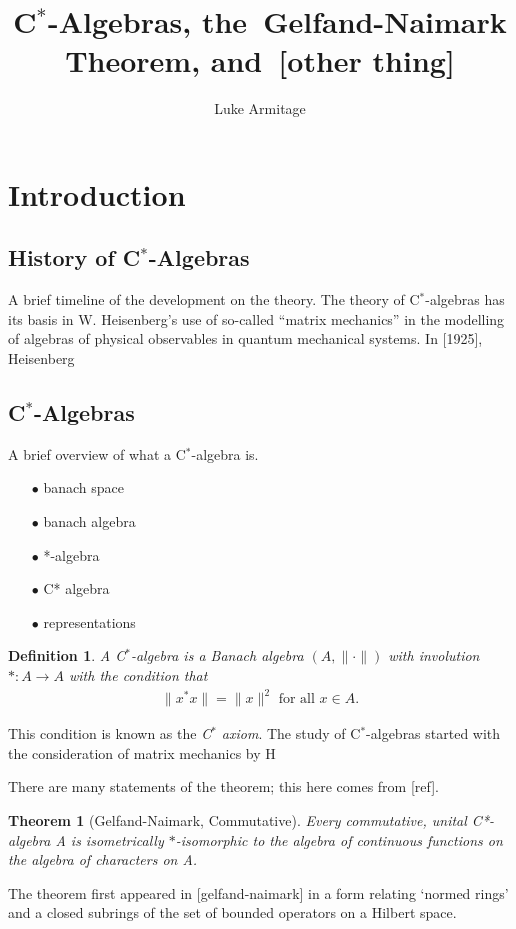 \documentclass[12pt,a4paper]{amsart}
\author{Luke Armitage}
\title{C$^\ast$-Algebras, the~Gelfand-Naimark Theorem, and~[other thing]}
\theoremstyle{plain}
\newtheorem*{thm*}{Theorem}
\theoremstyle{defn}
\newtheorem{defn}{Definition}
\begin{document}
\maketitle
\section{Introduction}
\subsection{History of C$^\ast$-Algebras}
	A brief timeline of the development on the theory.
The theory of C$^\ast$-algebras has its basis in W. Heisenberg's use of so-called ``matrix mechanics'' in the modelling of algebras of physical observables in quantum mechanical systems. In [1925], Heisenberg 
	
\subsection{C$^\ast$-Algebras}
	A brief overview of what a C$^\ast$-algebra is.
\begin{enumerate}
	\item[$\bullet$] banach space
	\item[$\bullet$] banach algebra
	\item[$\bullet$] *-algebra
	\item[$\bullet$] C* algebra
	\item[$\bullet$] representations
\end{enumerate}
\begin{defn}
A \emph{C$^\ast$-algebra} is a Banach algebra $(A, \| \cdot \|)$ with involution $\ast : A \to A$ with the condition that
\begin{align*}
	\|x ^\ast x\| = \|x\|^2 \mbox{ for all } x \in A.
\end{align*}
\end{defn}

This condition is known as the \emph{C$^\ast$ axiom}. The study of C$^\ast$-algebras started with the consideration of matrix mechanics by H

There are many statements of the theorem; this here comes from [ref].
\begin{thm*}[Gelfand-Naimark, Commutative]
	Every commutative, unital C*-algebra A is isometrically $\ast$-isomorphic to the algebra of continuous functions on the algebra of characters on A.

\end{thm*}
The theorem first appeared in [gelfand-naimark] in a form relating `normed rings' and a closed subrings of the set of bounded operators on a Hilbert space.
\end{document}
